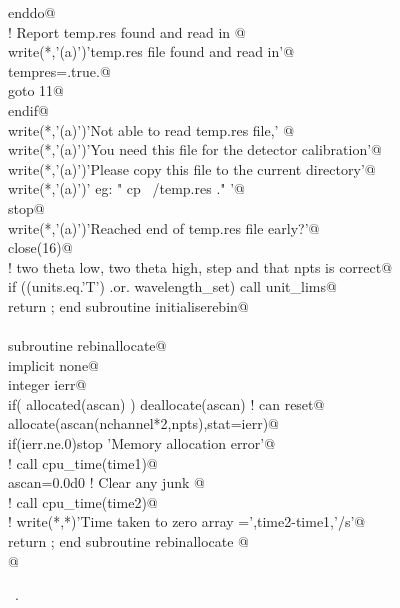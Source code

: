 \documentclass[10pt,a4paper,notitlepage]{article}
\begin{document}
\begin{flushleft}
\begin{minipage}{\linewidth}
\begin{list}{}{}
\mbox{}\verb@         enddo@\\
\mbox{}\verb@! Report temp.res found and read in         @\\
\mbox{}\verb@         write(*,'(a)')'temp.res file found and read in'@\\
\mbox{}\verb@         tempres=.true.@\\
\mbox{}\verb@        goto 11@\\
\mbox{}\verb@      endif@\\
\mbox{}    write(*,'(a)')'Not able to read temp.res file,'                 @\\
\mbox{}\verb@      write(*,'(a)')'You need this file for the detector calibration'@\\
\mbox{}\verb@      write(*,'(a)')'Please copy this file to the current directory'@\\
\mbox{}\verb@      write(*,'(a)')' eg:  " cp ~/temp.res ." '@\\
\mbox{}\verb@      stop@\\
\mbox{}    write(*,'(a)')'Reached end of temp.res file early?'@\\
\mbox{}    close(16)@\\
\mbox{}\verb@! two theta low, two theta high, step and that npts is correct@\\
\mbox{}\verb@      if ((units.eq.'T') .or. wavelength_set) call unit_lims@\\
\mbox{}\verb@      return ; end subroutine initialiserebin@\\
\mbox{}\verb@@\\
\mbox{}\verb@      subroutine rebinallocate@\\
\mbox{}\verb@      implicit none@\\
\mbox{}\verb@      integer ierr@\\
\mbox{}\verb@      if( allocated(ascan) ) deallocate(ascan) ! can reset@\\
\mbox{}\verb@      allocate(ascan(nchannel*2,npts),stat=ierr)@\\
\mbox{}\verb@      if(ierr.ne.0)stop 'Memory allocation error'@\\
\mbox{}\verb@!      call cpu_time(time1)@\\
\mbox{}\verb@      ascan=0.0d0   ! Clear any junk  @\\
\mbox{}\verb@!      call cpu_time(time2)@\\
\mbox{}\verb@!      write(*,*)'Time taken to zero array =',time2-time1,'/s'@\\
\mbox{}\verb@      return ; end subroutine rebinallocate      @\\
\mbox{}\verb@      @{\NWsep}
\end{list}
\vspace{-1.5ex}
\footnotesize
\begin{list}{}{\setlength{\itemsep}{-\parsep}\setlength{\itemindent}{-\leftmargin}}
\item \NWtxtMacroRefIn\ .


\end{list}
\end{minipage}
\end{flushleft}
\end{document}
